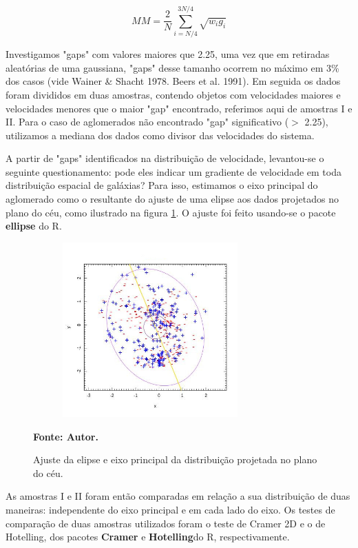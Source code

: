 \begin{equation}
MM = \frac{2}{N} \sum_{i=N/4}^{3N/4} \sqrt{w_i g_i}
\label{eq:gappomderado}
\end{equation}

Investigamos "gaps" com valores maiores que 2.25, uma vez que em retiradas aleatórias de uma gaussiana, "gaps" desse tamanho ocorrem no máximo em 3\% dos casos (vide Wainer \& Shacht 1978. Beers et al. 1991). Em seguida os dados foram divididos em duas amostras, contendo objetos com velocidades maiores e velocidades menores que o maior "gap" encontrado, referimos aqui de amostras I e II. Para o caso de aglomerados não encontrado "gap" significativo ($>$ 2.25), utilizamos a mediana dos dados como divisor das velocidades do sistema.


A partir de "gaps" identificados na distribuição de velocidade, levantou-se o seguinte questionamento: pode eles indicar um gradiente de velocidade em toda distribuição espacial de galáxias? Para isso, estimamos o eixo principal do aglomerado como o resultante do ajuste de uma elipse aos dados projetados no plano do céu, como ilustrado na figura \ref{elipse}. O ajuste foi feito usando-se o pacote \textbf{ellipse} do R.

\begin{figure}[H] %
\vspace{-2pt}
\begin{center}
\includegraphics[height=6.7cm,width=9cm]{04-figuras/elipse}%
\caption{Ajuste da elipse e eixo principal da distribuição projetada no plano do céu.}
\textbf{Fonte: Autor.}
\label{elipse}%
\end{center}
\end{figure}

As amostras I e II foram então comparadas em relação a sua distribuição de duas maneiras: independente do eixo principal e em cada lado do eixo.
Os testes de comparação de duas amostras utilizados foram o teste de Cramer 2D e o de Hotelling, dos pacotes \textbf{ Cramer} e \textbf{ Hotelling}do R, respectivamente. 

